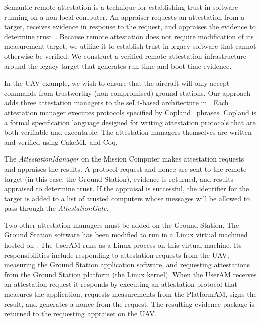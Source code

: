 Semantic remote attestation is a technique for  establishing
trust in software running on a non-local computer.  
An appraiser requests an attestation from
a target, receives evidence in response to the request, and appraises
the evidence to determine
trust~\cite{Coker::Principles-of-R}. Because
remote attestation does not require modification of its measurement
target, we utilize it to establish trust in legacy software
that cannot otherwise be verified.  We construct a verified remote
attestation infrastructure around the legacy target that generates
run-time and boot-time evidence.

In the UAV example, we wish to ensure that the aircraft will only accept
commands from trustworthy (non-compromised) ground stations.  
Our approach adds three attestation managers to the seL4-based
architecture in .  Each attestation
manager executes protocols specified by Copland~\cite{Ramsdell:2019aa}
phrases.  Copland is a formal specification language designed for
writing attestation protocols that are both verifiable and executable.
The attestation managers themselves are written and verified using
CakeML and Coq.

The \emph{AttestationManager} on the Mission Computer makes
attestation requests and appraises the results.  A protocol request and nonce are
sent to the remote target (in this case, the Ground Station), 
evidence is returned, and results appraised to
determine trust.  If the appraisal is successful, the identifier for the 
target is added to a list of trusted computers whose messages 
will be allowed to pass through the \emph{AttestationGate}.  

Two other attestation managers must be added on the Ground Station.  
The Ground Station software has been modified to run in a Linux virtual 
machined hosted on \selFour.  
The UserAM runs as a Linux process on this virtual machine.  Its
responsibilities include responding to attestation requests from the UAV, 
measuring the Ground Station application software, and requesting
attestations from the Ground Station platform (the Linux kernel).  When the UserAM receives an
attestation request it responds by executing an attestation protocol
that measures the application, requests measurements from the
PlatformAM, signs the result, and generates a nonce from the request.  The
resulting evidence package is returned to the requesting appraiser on the UAV.

